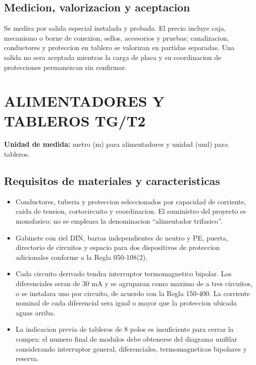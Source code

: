 \subsection{Medicion, valorizacion y aceptacion}
Se medira por salida especial instalada y probada. El precio incluye caja, mecanismo o
borne de conexion, sellos, accesorios y pruebas; canalizacion, conductores y proteccion
en tablero se valorizan en partidas separadas. Una salida no sera aceptada mientras la
carga de placa y su coordinacion de protecciones permanezcan sin confirmar.

\section{ALIMENTADORES Y TABLEROS TG/T2}

\textbf{Unidad de medida:} metro (m) para alimentadores y unidad (und) para tableros.

\subsection{Requisitos de materiales y caracteristicas}
\begin{itemize}
  \item Conductores, tuberia y proteccion seleccionados por capacidad de corriente,
  caida de tension, cortocircuito y coordinacion. El suministro del proyecto es
  monofasico; no se empleara la denominacion ``alimentador trifasico''.
  \item Gabinete con riel DIN, barras independientes de neutro y PE, puerta, directorio
  de circuitos y espacio para dos dispositivos de proteccion adicionales conforme a
  la Regla 050-108(2).
  \item Cada circuito derivado tendra interruptor termomagnetico bipolar. Los
  diferenciales seran de 30 mA y se agruparan como maximo de a tres circuitos, o se
  instalara uno por circuito, de acuerdo con la Regla 150-400. La corriente nominal de
  cada diferencial sera igual o mayor que la proteccion ubicada aguas arriba.
  \item La indicacion previa de tableros de 8 polos es insuficiente para cerrar la
  compra: el numero final de modulos debe obtenerse del diagrama unifilar considerando
  interruptor general, diferenciales, termomagneticos bipolares y reserva.
\end{itemize}

